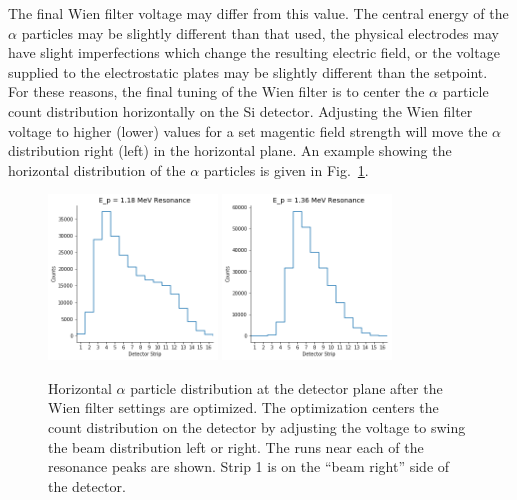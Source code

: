 The final Wien filter voltage may differ from this value. The central
energy of the $\alpha$ particles may be slightly different than that
used, the physical electrodes may have slight imperfections which change
the resulting electric field, or the voltage supplied to the
electrostatic plates may be slightly different than the setpoint. For
these reasons, the final tuning of the Wien filter is to center the
$\alpha$ particle count distribution horizontally on the Si detector.
Adjusting the Wien filter voltage to higher (lower) values for a set
magentic field strength will move the $\alpha$ distribution right (left)
in the horizontal plane. An example showing the horizontal
distribution of the $\alpha$ particles is given in
Fig.~\ref{fig:alpha-distribution-strips}.

\begin{figure}
    \begin{center}
        \centerline{
            \includegraphics[width=0.4\textwidth]{figures/low_resonance_detector_strips.png}
            \includegraphics[width=0.4\textwidth]{figures/high_resonance_detector_strips.png}
        }
        \caption[Horizontal $\alpha$ particle distribution]{Horizontal
            $\alpha$ particle distribution at the detector plane after
            the Wien filter settings are optimized. The optimization
            centers the count distribution on the detector by adjusting
            the voltage to swing the beam distribution left or right.
            The runs near each of the resonance peaks are shown. Strip 1
            is on the ``beam right'' side of the detector.}
        \label{fig:alpha-distribution-strips}
    \end{center}
\end{figure}

